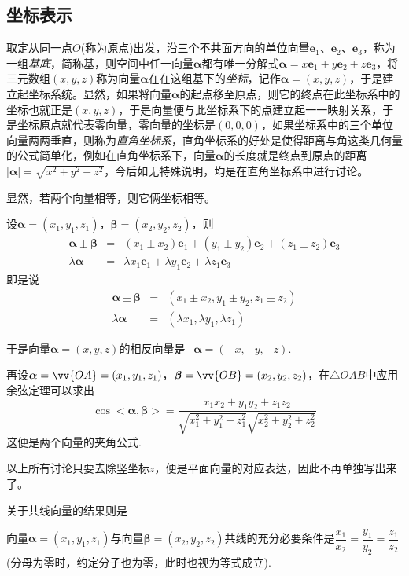 \subsection{坐标表示}
\label{sec:codrnation-of-vector}

取定从同一点$O$(称为原点)出发，沿三个不共面方向的单位向量$\bm{e}_1$、$\bm{e}_2$、$\bm{e}_3$，称为一组\emph{基底}，简称基，则空间中任一向量$\bm{\alpha}$都有唯一分解式$\bm{\alpha}=x\bm{e}_1+y\bm{e}_2+z\bm{e}_3$，将三元数组$(x,y,z)$称为向量$\bm{\alpha}$在在这组基下的\emph{坐标}，记作$\bm{\alpha}=(x,y,z)$，于是建立起坐标系统。显然，如果将向量$\bm{\alpha}$的起点移至原点，则它的终点在此坐标系中的坐标也就正是$(x,y,z)$，于是向量便与此坐标系下的点建立起一一映射关系，于是坐标原点就代表零向量，零向量的坐标是$(0,0,0)$，如果坐标系中的三个单位向量两两垂直，则称为\emph{直角坐标系}，直角坐标系的好处是使得距离与角这类几何量的公式简单化，例如在直角坐标系下，向量$\bm{\alpha}$的长度就是终点到原点的距离$|\bm{\alpha}| = \sqrt{x^2+y^2+z^2}$，今后如无特殊说明，均是在直角坐标系中进行讨论。

显然，若两个向量相等，则它俩坐标相等。

设$\bm{\alpha}=(x_1,y_1,z_1)$，$\bm{\beta}=(x_2,y_2,z_2)$，则
\begin{eqnarray*}
  \bm{\alpha} \pm \bm{\beta} & = & (x_1 \pm x_2)\bm{e}_1+(y_1 \pm y_2)\bm{e}_2 + (z_1 \pm z_2) \bm{e}_3 \\
  \lambda \bm{\alpha} & = & \lambda x_1 \bm{e}_1 + \lambda y_1 \bm{e}_2 + \lambda z_1 \bm{e}_3
\end{eqnarray*}
即是说
\begin{eqnarray*}
  \bm{\alpha} \pm \bm{\beta} & = & (x_1 \pm x_2, y_1 \pm y_2, z_1 \pm z_2) \\
  \lambda \bm{\alpha} & = & (\lambda x_1, \lambda y_1, \lambda z_1)
\end{eqnarray*}

于是向量$\bm{\alpha}=(x,y,z)$的相反向量是$-\bm{\alpha}=(-x,-y,-z)$.

再设$\bm{\alpha}=\vv{OA}=(x_1,y_1,z_1)$，$\bm{\beta}=\vv{OB}=(x_2,y_2,z_2)$，在$\triangle OAB$中应用余弦定理可以求出
\[ \cos{<\bm{\alpha},\bm{\beta}>} = \frac{x_1x_2+y_1y_2+z_1z_2}{\sqrt{x_1^2+y_1^2+z_1^2} \sqrt{x_2^2+y_2^2+z_2^2}} \]
这便是两个向量的夹角公式.

以上所有讨论只要去除竖坐标$z$，便是平面向量的对应表达，因此不再单独写出来了。

关于共线向量的结果则是
\begin{theorem}
  \label{theorem:collinear-vector-codrnation}
  向量$\bm{\alpha}=(x_1,y_1,z_1)$与向量$\bm{\beta}=(x_2,y_2,z_2)$共线的充分必要条件是$\dfrac{x_1}{x_2}=\dfrac{y_1}{y_2}=\dfrac{z_1}{z_2}$(分母为零时，约定分子也为零，此时也视为等式成立).
\end{theorem}

